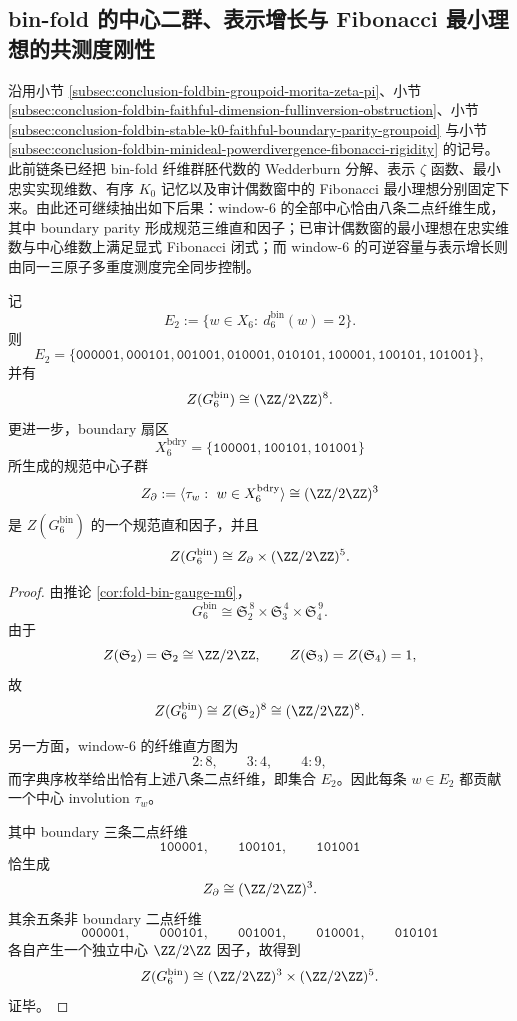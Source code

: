 \subsection{bin-fold 的中心二群、表示增长与 Fibonacci 最小理想的共测度刚性}\label{subsec:conclusion-foldbin-center-zeta-fibonacci-measure-rigidity}
沿用小节 \ref{subsec:conclusion-foldbin-groupoid-morita-zeta-pi}、小节 \ref{subsec:conclusion-foldbin-faithful-dimension-fullinversion-obstruction}、小节 \ref{subsec:conclusion-foldbin-stable-k0-faithful-boundary-parity-groupoid} 与小节 \ref{subsec:conclusion-foldbin-minideal-powerdivergence-fibonacci-rigidity} 的记号。此前链条已经把 bin-fold 纤维群胚代数的 Wedderburn 分解、表示 \(\zeta\) 函数、最小忠实实现维数、有序 \(K_0\) 记忆以及审计偶数窗中的 Fibonacci 最小理想分别固定下来。由此还可继续抽出如下后果：window-\(6\) 的全部中心恰由八条二点纤维生成，其中 boundary parity 形成规范三维直和因子；已审计偶数窗的最小理想在忠实维数与中心维数上满足显式 Fibonacci 闭式；而 window-\(6\) 的可逆容量与表示增长则由同一三原子多重度测度完全同步控制。

\begin{theorem}\label{thm:conclusion-window6-full-center-twofiber-factorization}
记
\[
E_2:=\{w\in X_6:\ d_6^{\mathrm{bin}}(w)=2\}.
\]
则
\[
E_2=
\{\texttt{000001},\texttt{000101},\texttt{001001},\texttt{010001},
\texttt{010101},\texttt{100001},\texttt{100101},\texttt{101001}\},
\]
并有
\[
Z(G_6^{\mathrm{bin}})\cong (\ZZ/2\ZZ)^8.
\]
更进一步，boundary 扇区
\[
X_6^{\mathrm{bdry}}
=
\{\texttt{100001},\texttt{100101},\texttt{101001}\}
\]
所生成的规范中心子群
\[
Z_{\partial}
:=
\langle \tau_w:\ w\in X_6^{\mathrm{bdry}}\rangle
\cong
(\ZZ/2\ZZ)^3
\]
是 \(Z(G_6^{\mathrm{bin}})\) 的一个规范直和因子，并且
\[
Z(G_6^{\mathrm{bin}})
\cong
Z_{\partial}\times (\ZZ/2\ZZ)^5.
\]
\end{theorem}
\begin{proof}
由推论 \ref{cor:fold-bin-gauge-m6}，
\[
G_6^{\mathrm{bin}}
\cong
\mathfrak S_2^{\,8}\times \mathfrak S_3^{\,4}\times \mathfrak S_4^{\,9}.
\]
由于
\[
Z(\mathfrak S_2)=\mathfrak S_2\cong \ZZ/2\ZZ,
\qquad
Z(\mathfrak S_3)=Z(\mathfrak S_4)=1,
\]
故
\[
Z(G_6^{\mathrm{bin}})\cong Z(\mathfrak S_2)^8\cong (\ZZ/2\ZZ)^8.
\]

另一方面，window-\(6\) 的纤维直方图为
\[
2:8,\qquad 3:4,\qquad 4:9,
\]
而字典序枚举给出恰有上述八条二点纤维，即集合 \(E_2\)。因此每条 \(w\in E_2\) 都贡献一个中心 involution \(\tau_w\)。

其中 boundary 三条二点纤维
\[
\texttt{100001},\qquad
\texttt{100101},\qquad
\texttt{101001}
\]
恰生成
\[
Z_{\partial}\cong (\ZZ/2\ZZ)^3.
\]
其余五条非 boundary 二点纤维
\[
\texttt{000001},\qquad
\texttt{000101},\qquad
\texttt{001001},\qquad
\texttt{010001},\qquad
\texttt{010101}
\]
各自产生一个独立中心 \(\ZZ/2\ZZ\) 因子，故得到
\[
Z(G_6^{\mathrm{bin}})\cong (\ZZ/2\ZZ)^3\times (\ZZ/2\ZZ)^5.
\]
证毕。
\end{proof}

